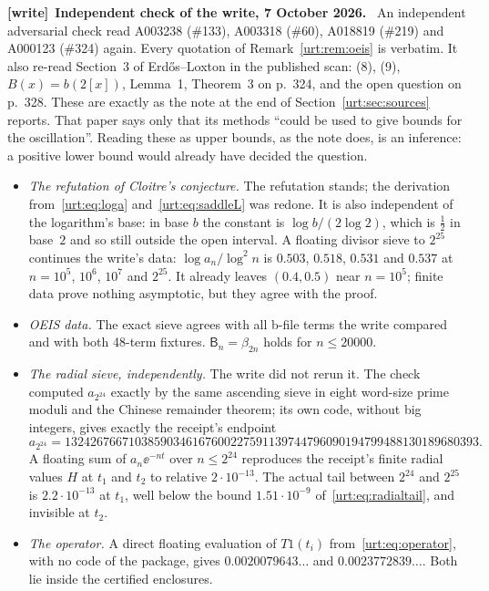 \documentclass[11pt,letterpaper]{article}
\theoremstyle{remark}\newtheorem{remark}[theorem]{Remark}
\newcommand{\Beta}{\mathsf B}
\newenvironment{writenote}[1][]{\par\smallskip\begingroup\small
 \noindent\textbf{[write]}\if\relax\detokenize{#1}\relax\else~\textbf{#1.}\fi\ }%
 {\par\endgroup\smallskip}
\begin{document}
\begin{writenote}[Independent check of the write, 7 October 2026]
An independent adversarial check read A003238 (\#133), A003318 (\#60), A018819 (\#219) and A000123 (\#324) again. Every quotation of Remark~\ref{urt:rem:oeis} is verbatim. It also re-read Section~3 of Erd\H{o}s--Loxton in the published scan: (8), (9), $B(x)=b(2[x])$, Lemma~1, Theorem~3 on p.~324, and the open question on p.~328. These are exactly as the note at the end of Section~\ref{urt:sec:sources} reports. That paper says only that its methods ``could be used to give bounds for the oscillation''. Reading these as upper bounds, as the note does, is an inference: a positive lower bound would already have decided the question.
\begin{itemize}
\item \emph{The refutation of Cloitre's conjecture.} The refutation stands; the derivation from~\eqref{urt:eq:loga} and~\eqref{urt:eq:saddleL} was redone. It is also independent of the logarithm's base: in base $b$ the constant is $\log b/(2\log2)$, which is $\tfrac12$ in base~$2$ and so still outside the open interval. A floating divisor sieve to $2^{25}$ continues the write's data: $\log a_n/\log^2n$ is $0.503$, $0.518$, $0.531$ and $0.537$ at $n=10^5$, $10^6$, $10^7$ and $2^{25}$. It already leaves $(0.4,0.5)$ near $n=10^5$; finite data prove nothing asymptotic, but they agree with the proof.
\item \emph{OEIS data.} The exact sieve agrees with all b-file terms the write compared and with both 48-term fixtures. $\Beta_n=\beta_{2n}$ holds for $n\le20000$.
\item \emph{The radial sieve, independently.} The write did not rerun it. The check computed $a_{2^{24}}$ exactly by the same ascending sieve in eight word-size prime moduli and the Chinese remainder theorem; its own code, without big integers, gives exactly the receipt's endpoint
\[a_{2^{24}}=13242676671038590346167600227591139744796090194799488130189680393.\] A floating sum of $a_n\ee^{-nt}$ over $n\le2^{24}$ reproduces the receipt's finite radial values $H$ at $t_1$ and $t_2$ to relative $2\cdot10^{-13}$. The actual tail between $2^{24}$ and $2^{25}$ is $2.2\cdot10^{-13}$ at $t_1$, well below the bound $1.51\cdot10^{-9}$ of~\eqref{urt:eq:radialtail}, and invisible at $t_2$.
\item \emph{The operator.} A direct floating evaluation of $T1(t_i)$ from~\eqref{urt:eq:operator}, with no code of the package, gives $0.0020079643\ldots$ and $0.0023772839\ldots$. Both lie inside the certified enclosures.

\end{itemize}
\end{writenote}
\end{document}
